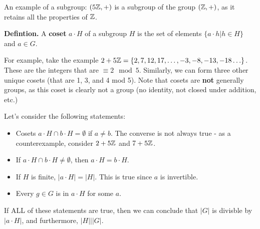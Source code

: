 An example of a subgroup: $(5\mathbb{Z}, +)$ is a subgroup of the group $(\mathbb{Z}, +)$, as it retains all the properties of $\mathbb{Z}$. 

\textbf{Defintion. } A \textbf{coset} $a\cdot H$ of a subgroup $H$ is the set of elements $\{ a \cdot h | h \in H\}$ and $a \in G$. 

For example, take the example $2 + 5\mathbb{Z} = \{2, 7, 12, 17, \ldots, -3, -8, -13 ,-18 \ldots \}$. These are the integers that are $\equiv 2 \mod 5$. Similarly, we can form three other unique cosets (that are 1, 3, and 4 mod 5). Note that cosets are \textbf{not} generally groups, as this coset is clearly not a group (no identity, not closed under addition, etc.) 

Let's consider the following statements: 
\begin{itemize}
\item Cosets $a \cdot H \cap b \cdot H = \emptyset$ if $a \neq b$. The converse is not always true - as a counterexample, consider $2 + 5 \mathbb{Z}$ and $ 7 + 5 \mathbb{Z}$. 
\item If $a \cdot H \cap b \cdot H \neq \emptyset$, then $a\cdot H = b \cdot H$. 
\item If $H$ is finite, $|a\cdot H| = |H|$. This is true since $a$ is invertible.
\item Every $g \in G$ is in $a \cdot H$ for some $a$. 
\end{itemize}
If ALL of these statements are true, then we can conclude that $|G|$ is divisble by $|a\cdot H|$, and furthermore, $|H| | |G|$. 

% 
